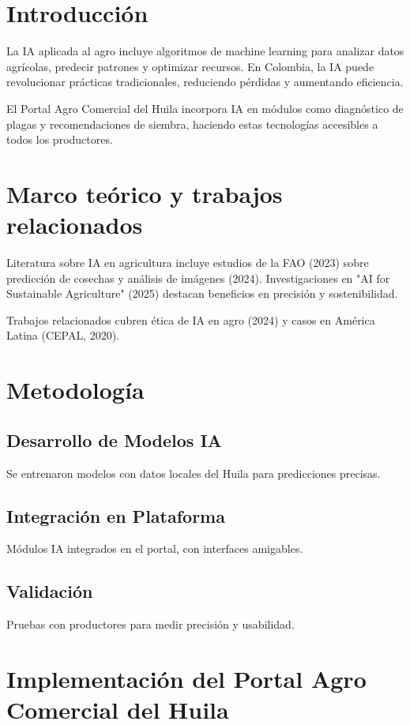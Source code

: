\section{Introducción}

La IA aplicada al agro incluye algoritmos de machine learning para analizar datos agrícolas, predecir patrones y optimizar recursos. En Colombia, la IA puede revolucionar prácticas tradicionales, reduciendo pérdidas y aumentando eficiencia.

El Portal Agro Comercial del Huila incorpora IA en módulos como diagnóstico de plagas y recomendaciones de siembra, haciendo estas tecnologías accesibles a todos los productores.

\section{Marco teórico y trabajos relacionados}

Literatura sobre IA en agricultura incluye estudios de la FAO (2023) sobre predicción de cosechas y análisis de imágenes (2024). Investigaciones en "AI for Sustainable Agriculture" (2025) destacan beneficios en precisión y sostenibilidad.

Trabajos relacionados cubren ética de IA en agro (2024) y casos en América Latina (CEPAL, 2020).

\section{Metodología}

\subsection{Desarrollo de Modelos IA}
Se entrenaron modelos con datos locales del Huila para predicciones precisas.

\subsection{Integración en Plataforma}
Módulos IA integrados en el portal, con interfaces amigables.

\subsection{Validación}
Pruebas con productores para medir precisión y usabilidad.

\section{Implementación del Portal Agro Comercial del Huila}

